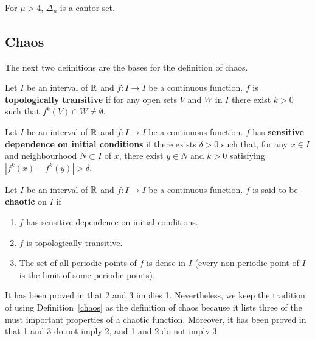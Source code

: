 \begin{theorem}
For $\mu > 4$, $\Delta_\mu$ is a cantor set.
\end{theorem}

\subsection{Chaos}

The next two definitions are the bases for the definition of chaos.

\begin{defn}
Let $I$ be an interval of $\mathbb{R}$ and $f:I\rightarrow I$ be a
continuous function.  $f$ is
{\bfseries topologically transitive} if
for any open sets $V$ and $W$ in $I$ there exist $k>0$ such that
$f^k(V) \cap W \neq \emptyset$.
\end{defn}

\begin{defn}
Let $I$ be an interval of $\mathbb{R}$ and $f:I\rightarrow I$ be a
continuous function.  $f$ has
{\bfseries sensitive dependence on initial conditions} if there exists
$\delta>0$ such that, for any $x \in I$ and neighbourhood $N \subset I$
of $x$, there exist $y\in N$ and $k>0$ satisfying
$\left| f^k(x) - f^k(y) \right| > \delta$.
\end{defn}

\begin{defn}[Chaos]
Let $I$ be an interval of $\mathbb{R}$ and $f:I\rightarrow I$ be a
continuous function.  $f$ is said to be
{\bfseries chaotic} on $I$ if
\begin{enumerate}
\item $f$ has sensitive dependence on initial conditions.
\item $f$ is topologically transitive.
\item The set of all periodic points of $f$ is dense in $I$ (every
  non-periodic point of $I$ is the limit of some periodic points).
\end{enumerate}
\label{chaos}
\end{defn}

\begin{rmk}
It has been proved in \cite{BBCDS} that 2 and 3 implies 1.
Nevertheless, we keep the tradition of using Definition~\ref{chaos} as
the definition of chaos because it lists three of the must important
properties of a chaotic function.  Moreover, it has been proved in
\cite{AG} that 1 and 3 do not imply 2, and 1 and 2 do not imply 3.
\end{rmk}

